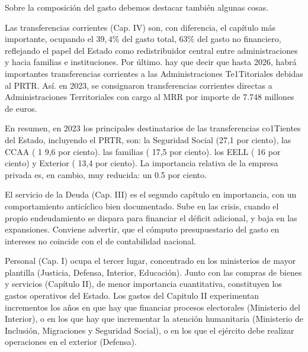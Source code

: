 \documentclass[10pt,a4paper]{article}
\begin{document}
Sobre la composición del gasto debemos destacar también algunas cosas. 

Las transferencias corrientes (Cap. IV) son, con diferencia, el capítulo más importante, ocupando el $39,4\%$ del gasto total, $63\%$ del gasto no financiero, reflejando el papel del Estado como redistribuidor central entre administraciones y hacia familias e instituciones. Por último. hay que decir que hasta 2026, habrá importantes transferencias corrientes a las Administraciones Te1Titoriales debidas al PRTR. Así. en 2023, se consignaron transferencias corrientes directas a Administraciones Territoriales con cargo al MRR por importe de 7.748 millones de euros.

En resumen, en 2023 los principales destinatarios de las transferencias co1Tientes del Estado, incluyendo el PRTR, son: la Seguridad Social (27,1 por ciento), las CCAA ( 1 9,6 por ciento). las familias ( 17,5 por ciento). los EELL ( 16 por ciento) y Exterior ( 13,4 por ciento). La importancia relativa de la empresa privada es, en cambio, muy reducida: un 0.5 por ciento.

El servicio de la Deuda (Cap. III) es el segundo capítulo en importancia, con un comportamiento anticíclico bien documentado. Sube en las crisis, cuando el propio endeudamiento se dispara para financiar el déficit adicional, y baja en las expansiones. Conviene advertir, que el cómputo presupuestario del gasto en intereses no coincide con el de contabilidad nacional.

Personal (Cap. I) ocupa el tercer lugar, concentrado en los ministerios de mayor plantilla (Justicia, Defensa, Interior, Educación). Junto con las compras de bienes y servicios (Capítulo II), de menor importancia cuantitativa, constituyen los gastos operativos del Estado. Los gastos del Capitulo II experimentan incrementos los años en que hay que financiar procesos electorales (Ministerio del Interior), o en los que hay que incrementar la atención humanitaria (Ministerio de Inclusión, Migraciones y Seguridad Social), o en los que el ejército debe realizar operaciones en el exterior (Defensa).
\end{document}
